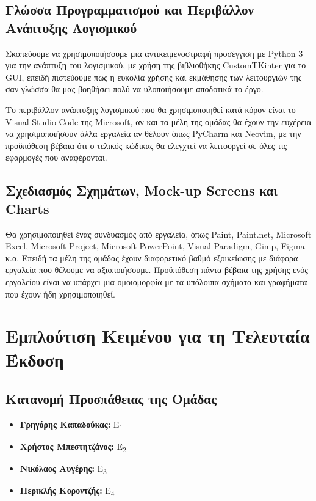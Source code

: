 \documentclass[12pt,a4paper]{article}
\begin{document}
\subsection{Γλώσσα Προγραμματισμού και Περιβάλλον Ανάπτυξης Λογισμικού}
Σκοπεύουμε να χρησιμοποιήσουμε μια αντικειμενοστραφή προσέγγιση με Python 3 για την ανάπτυξη του λογισμικού, με χρήση της βιβλιοθήκης CustomTKinter για το GUI, επειδή πιστεύουμε πως η ευκολία χρήσης και εκμάθησης των λειτουργιών της σαν γλώσσα θα μας βοηθήσει πολύ να υλοποιήσουμε αποδοτικά το έργο.

Το περιβάλλον ανάπτυξης λογισμικού που θα χρησιμοποιηθεί κατά κόρον είναι το Visual Studio Code της Microsoft, αν και τα μέλη της ομάδας θα έχουν την ευχέρεια να χρησιμοποιήσουν άλλα εργαλεία αν θέλουν όπως PyCharm και Neovim, με την προϋπόθεση βέβαια ότι ο τελικός κώδικας θα ελεγχτεί να λειτουργεί σε όλες τις εφαρμογές που αναφέρονται.

\subsection{Σχεδιασμός Σχημάτων, Mock-up Screens και Charts}
Θα χρησιμοποιηθεί ένας συνδυασμός από εργαλεία, όπως Paint, Paint.net, Microsoft Excel, Microsoft Project, Microsoft PowerPoint, Visual Paradigm, Gimp, Figma κ.α. Επειδή τα μέλη της ομάδας έχουν διαφορετικό βαθμό εξοικείωσης με διάφορα εργαλεία που θέλουμε να αξιοποιήσουμε. Προϋπόθεση πάντα βέβαια της χρήσης ενός εργαλείου είναι να υπάρχει μια ομοιομορφία με τα υπόλοιπα σχήματα και γραφήματα που έχουν ήδη χρησιμοποιηθεί.

\section{Εμπλούτιση Κειμένου για τη Τελευταία Έκδοση}
\label{Final Chapter}

\subsection{Κατανομή Προσπάθειας της Ομάδας}

\begin{itemize}
    \item \textbf{Γρηγόρης Καπαδούκας:} Ε\textsubscript{1} = 
	\item \textbf{Χρήστος Μπεστητζάνος:} Ε\textsubscript{2} = 
	\item \textbf{Νικόλαος Αυγέρης:} Ε\textsubscript{3} =  
	\item \textbf{Περικλής Κοροντζής:} Ε\textsubscript{4} =  
\end{itemize}
\end{document}
